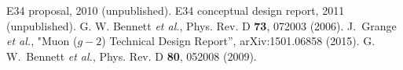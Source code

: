  E34 proposal, 2010 (unpublished).
 E34 conceptual design report, 2011 (unpublished).
 G. W. Bennett {\it et al.}, Phys. Rev. D {\bf 73}, 072003 (2006).
 J.~Grange {\it et al.}, "Muon ($g-2$) Technical Design Report'', arXiv:1501.06858 (2015).
 G. W.~Bennett {\it et al.}, Phys. Rev. D {\bf 80}, 052008 (2009).
